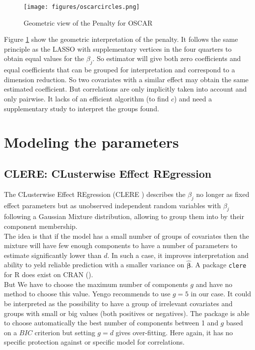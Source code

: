\documentclass[12pt,a4paper]{report}
\begin{document}
\begin{figure}[h!]
			\centering
			\texttt{[image: figures/oscarcircles.png]} 
			\caption{Geometric view of the Penalty for OSCAR}\label{oscarcircles}
		\end{figure} 
Figure 	\ref{oscarcircles} show the geometric interpretation of the penalty. It follows the same principle as the LASSO with supplementary vertices in the four quarters to obtain equal values for the $\beta_j$. So estimator will give both zero coefficients and equal coefficients that can be grouped for interpretation and correspond to a dimension reduction. So two covariates with a similar effect may obtain the same estimated coefficient. But correlations are only implicitly taken into account and only pairwise. It lacks of an efficient algorithm  (to find $c$) and need a supplementary study to interpret the groups found.
		
		
	\section{Modeling the parameters}			%

		\subsection{CLERE: CLusterwise Effect REgression}		%

			The CLusterwise Effect REgression (\textsc{CLERE} \cite{yengo2012variable}) describes the $\beta_j$ no longer as fixed effect parameters but as unobserved independent random variables with $\beta_j$ following a Gaussian Mixture distribution, allowing to group them into by their component membership. \\
			
			 The idea is that if the model has a small number of groups of covariates then the mixture will have few enough components to have a number of parameters to estimate significantly lower than $d$. In such a case, it improves interpretation and ability to yeld reliable prediction with a smaller variance on $\boldsymbol{\hat{\beta}}$. A package {\tt clere} for R does exist on CRAN (\cite{packageclere}).%
			 \\
			 
			 But We have to choose the maximum number of components $g$ and have no method to choose this value. Yengo recommends to use $g=5$ in our case. It could be interpreted as the possibility to have a group of irrelevant covariates and groups with small or big values (both positives or negatives). The package is able to choose automatically the best number of components between 1 and $g$ based on a $BIC$ criterion but setting $g=d$ gives over-fitting.
	 Here again, it has no specific protection against or specific model for correlations. 
\end{document}
